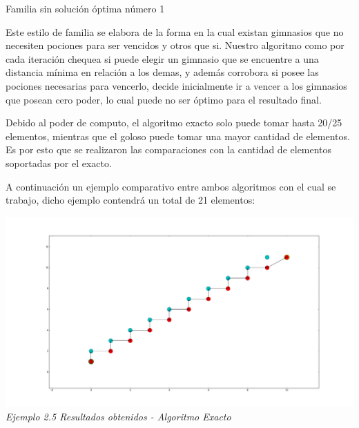 \begin{center}
Familia sin soluci\'on \'optima n\'umero 1
\end{center}

Este estilo de familia se elabora de la forma en la cual existan gimnasios que no necesiten pociones para ser vencidos y otros que si. Nuestro algoritmo como por cada iteraci\'on chequea si puede elegir un gimnasio que se encuentre a una distancia m\'inima en relaci\'on a los demas, y adem\'as corrobora si posee las pociones necesarias para vencerlo, decide inicialmente ir a vencer a los gimnasios que posean cero poder, lo cual puede no ser \'optimo para el resultado final.

Debido al poder de computo, el algoritmo exacto solo puede tomar hasta 20/25 elementos, mientras que el goloso puede tomar una mayor cantidad de elementos. Es por esto que se realizaron las comparaciones con la cantidad de elementos soportadas por el exacto.

A continuaci\'on un ejemplo comparativo entre ambos algoritmos con el cual se trabajo, dicho ejemplo contendr\'a un total de 21 elementos:


\vspace*{0.3cm} \vspace*{0.3cm}
  \begin{center}
\includegraphics[scale=0.40]{./EJ2/algunGym0Exacto.png}
\\{\textit{Ejemplo 2.5 Resultados obtenidos - Algoritmo Exacto }}
  \end{center}
  \vspace*{0.3cm}


